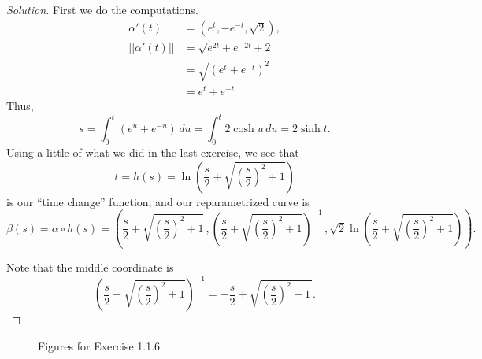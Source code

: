 \documentclass[Shifrin_Solutions_Spring_2018]{subfiles}
\begin{document}
\begin{proof}[Solution]
First we do the computations.
\begin{align*}
\alpha'(t) & = \left( e^t , -e^{-t} , \sqrt{2} \right) , \\
||\alpha'(t) || & =\sqrt{ e^{2t} + e^{-2t} + 2} \\
& = \sqrt{( e^t + e^{-t}  )^2} \\
& = e^t + e^{-t}
\end{align*}
Thus,
\[
s = \int_0^t (e^u + e^{-u} ) \, du = \int_0^t 2\cosh u \, du = 2 \sinh t.
\]
Using a little of what we did in the last exercise, we see that
\[
t = h(s) = \ln\left( \dfrac{s}{2} + \sqrt{\left(\dfrac{s}{2}\right)^2 + 1 } \right)
\]
is our ``time change'' function, and our reparametrized curve is
\[
\beta(s) = \alpha\circ h(s) = \left(
 \dfrac{s}{2} + \sqrt{\left(\dfrac{s}{2}\right)^2 + 1 } \, ,
\left( \dfrac{s}{2} + \sqrt{\left(\dfrac{s}{2}\right)^2 + 1 }\right)^{-1} \, ,
\sqrt{2}\ln\left(\dfrac{s}{2} + \sqrt{ \left(\dfrac{s}{2}\right)^2+1 } \right) \right) .
\]

Note that the middle coordinate is
\[
\left(\dfrac{s}{2} + \sqrt{\left(\dfrac{s}{2}\right)^2 + 1 }\right)^{-1} =  
- \dfrac{s}{2} + \sqrt{\left(\dfrac{s}{2}\right)^2 + 1\, }  .
\]

\end{proof}

\begin{figure}[h!]
\centering
{}
\caption{Figures for Exercise 1.1.6}
\end{figure}
\end{document}
